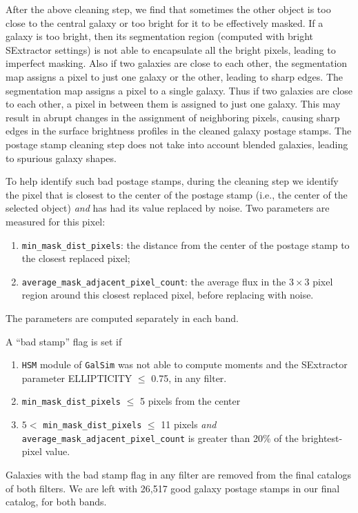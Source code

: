 \documentclass[a4paper,11pt]{article}
\begin{document}
After the above cleaning step, we find that sometimes the other object is too close to the central galaxy or too bright for it to be effectively masked.
If a galaxy is too bright, then its segmentation region (computed with bright SExtractor settings)  is not able to encapsulate all the bright pixels, leading to imperfect masking. Also  if two galaxies are close to each other, the segmentation map assigns a pixel to just one galaxy or the other, leading to sharp edges. The segmentation map assigns a pixel to a single galaxy. Thus if two galaxies are close to each other, a pixel in between them  is assigned to just one galaxy. This may result in abrupt changes in the assignment of neighboring pixels, causing sharp edges in the surface brightness profiles in the cleaned galaxy postage stamps. The postage stamp cleaning step  does not take into account blended galaxies, leading to spurious galaxy shapes. 

To help identify such bad postage stamps,
during the cleaning step we identify the pixel that is closest to the center of the postage stamp (i.e., the center of the selected object) {\em and} has had its value replaced by noise. 
Two parameters are measured for this pixel:
\begin{enumerate}
\item  {\tt min\_mask\_dist\_pixels}: the distance from the center of the postage stamp to the closest replaced pixel;
\item {\tt average\_mask\_adjacent\_pixel\_count}: the average flux in the $3 \times 3$ pixel region around this closest replaced pixel, before replacing with noise.
\end{enumerate}
The parameters are computed separately in each band. 

A ``bad stamp'' flag is set if
\begin{enumerate}
\item {\tt HSM} module of {\tt GalSim} was not able to compute moments and the SExtractor parameter ELLIPTICITY $\leq $ 0.75, in any filter.
\item {\tt min\_mask\_dist\_pixels} $\leq $ 5 pixels from the center
\item $5<$ {\tt min\_mask\_dist\_pixels} $\leq $ 11 pixels {\em and} {\tt average\_mask\_adjacent\_pixel\_count} is greater than 20\% of the brightest-pixel value.
\end{enumerate}
Galaxies with the bad stamp flag in any filter are removed from the final catalogs of both filters.
We are left with 26,517 good galaxy postage stamps in our final catalog, for both bands.
\end{document}
